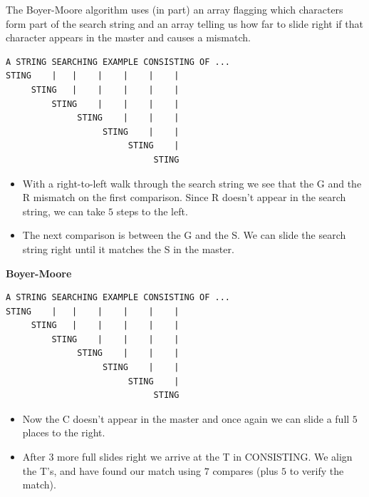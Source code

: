 \documentclass[a4,portraitt]{slides}
\begin{document}
{{The Boyer-Moore algorithm uses (in part) an array flagging
which characters form part of the search string and an array telling
us how far to slide right if that character appears in the master and causes
a mismatch.
{\small
\begin{verbatim}
A STRING SEARCHING EXAMPLE CONSISTING OF ...
STING    |   |    |    |    |    |
     STING   |    |    |    |    |
         STING    |    |    |    |
              STING    |    |    |
                   STING    |    |
                        STING    |
                             STING
\end{verbatim}
}
\begin{itemize}
\item With a right-to-left walk through the search string we see that
the G and the R mismatch on the first comparison. Since R doesn't appear in the
search string, we can take $5$ steps to the left.
\item The next comparison is between the G and the S. We can slide the search string right until it matches the S in the master.
\end{itemize}
}

\newpage
{\samepage
\begin{center}
{\Large{\bf Boyer-Moore}}
\end{center}
{\small
\begin{verbatim}
A STRING SEARCHING EXAMPLE CONSISTING OF ...
STING    |   |    |    |    |    |
     STING   |    |    |    |    |
         STING    |    |    |    |
              STING    |    |    |
                   STING    |    |
                        STING    |
                             STING
\end{verbatim}
}
\begin{itemize}
\item Now the C doesn't appear in the master and once again we can slide a
full $5$ places to the right.
\item After $3$ more full slides right we arrive at the T in CONSISTING.
We align the T's, and have found our match using $7$ compares (plus $5$
to verify the match).
\end{itemize}
}

}
\end{document}
